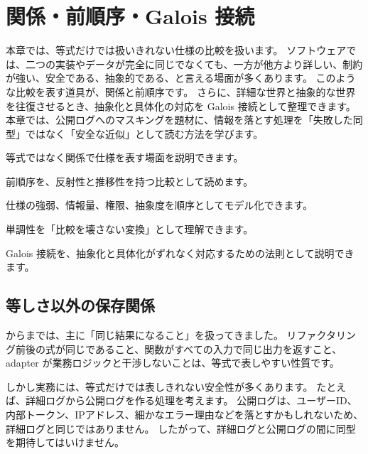 \chapter{関係・前順序・Galois 接続}
\label{chap:relations-preorders-galois}

\begin{chapterabstract}
本章では、等式だけでは扱いきれない仕様の比較を扱います。
ソフトウェアでは、二つの実装やデータが完全に同じでなくても、一方が他方より詳しい、制約が強い、安全である、抽象的である、と言える場面が多くあります。
このような比較を表す道具が、関係と前順序です。
さらに、詳細な世界と抽象的な世界を往復させるとき、抽象化と具体化の対応を Galois 接続として整理できます。
本章では、公開ログへのマスキングを題材に、情報を落とす処理を「失敗した同型」ではなく「安全な近似」として読む方法を学びます。
\end{chapterabstract}

\begin{learninggoals}
\item 等式ではなく関係で仕様を表す場面を説明できます。
\item 前順序を、反射性と推移性を持つ比較として読めます。
\item 仕様の強弱、情報量、権限、抽象度を順序としてモデル化できます。
\item 単調性を「比較を壊さない変換」として理解できます。
\item Galois 接続を、抽象化と具体化がずれなく対応するための法則として説明できます。
\end{learninggoals}

\section{等しさ以外の保存関係}

からまでは、主に「同じ結果になること」を扱ってきました。
リファクタリング前後の式が同じであること、関数がすべての入力で同じ出力を返すこと、adapter が業務ロジックと干渉しないことは、等式で表しやすい性質です。

しかし実務には、等式だけでは表しきれない安全性が多くあります。
たとえば、詳細ログから公開ログを作る処理を考えます。
公開ログは、ユーザーID、内部トークン、IPアドレス、細かなエラー理由などを落とすかもしれないため、詳細ログと同じではありません。
したがって、詳細ログと公開ログの間に同型を期待してはいけません。

